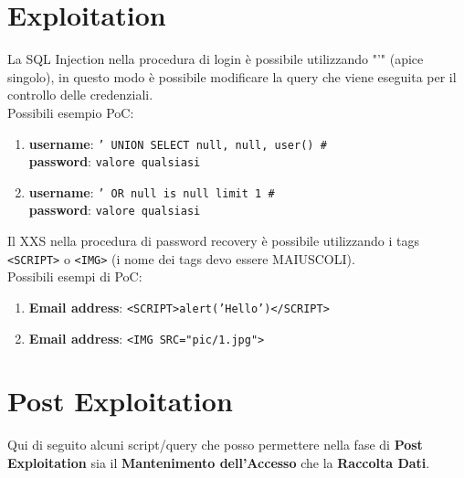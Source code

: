 \documentclass[12pt]{article}
\begin{document}
\section{Exploitation}
    La SQL Injection nella procedura di login \`{e} possibile utilizzando "'" 
    (apice singolo), in questo modo \`{e} possibile modificare la query che viene 
    eseguita per il controllo delle credenziali.\\ 
    Possibili esempio PoC:\\
    \begin{enumerate}
        \item \textbf{username}: \texttt{' UNION SELECT null, null, user() \#} \\
        \textbf{password}: \texttt{valore qualsiasi} \\
        \item \textbf{username}: \texttt{' OR null is null limit 1 \#} \\
        \textbf{password}: \texttt{valore qualsiasi} \\
    \end{enumerate}
    
    Il XXS nella procedura di password recovery \`{e} possibile utilizzando i tags
    \texttt{<SCRIPT>} o \texttt{<IMG>} (i nome dei tags devo essere MAIUSCOLI). \\
    Possibili esempi di PoC:
    \begin{enumerate}
        \item \textbf{Email address}: \texttt{<SCRIPT>alert('Hello')</SCRIPT>}
        \item \textbf{Email address}: \texttt{<IMG SRC="pic/1.jpg">}
    \end{enumerate}

\section{Post Exploitation}

Qui di seguito alcuni script/query che posso permettere nella fase di \textbf{Post Exploitation}
sia il \textbf{Mantenimento dell'Accesso} che la \textbf{Raccolta Dati}.
\end{document}
